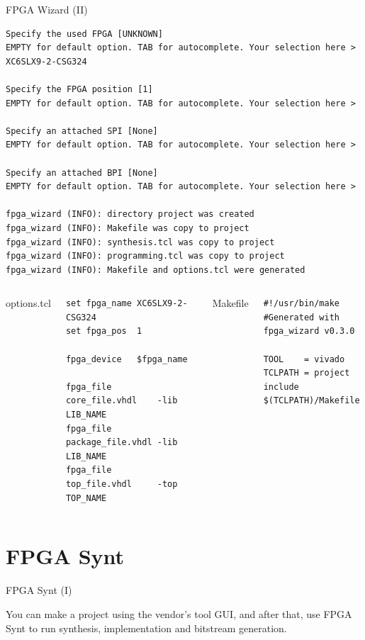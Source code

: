 \documentclass{beamer}
\begin{document}
\begin{frame}[fragile]{FPGA Wizard (II)}
  \tiny
  \begin{verbatim}
Specify the used FPGA [UNKNOWN]
EMPTY for default option. TAB for autocomplete. Your selection here > XC6SLX9-2-CSG324

Specify the FPGA position [1]
EMPTY for default option. TAB for autocomplete. Your selection here > 

Specify an attached SPI [None]
EMPTY for default option. TAB for autocomplete. Your selection here > 

Specify an attached BPI [None]
EMPTY for default option. TAB for autocomplete. Your selection here > 

fpga_wizard (INFO): directory project was created
fpga_wizard (INFO): Makefile was copy to project
fpga_wizard (INFO): synthesis.tcl was copy to project
fpga_wizard (INFO): programming.tcl was copy to project
fpga_wizard (INFO): Makefile and options.tcl were generated
  \end{verbatim}
  \begin{columns}
      options.tcl
      \begin{verbatim}
set fpga_name XC6SLX9-2-CSG324
set fpga_pos  1

fpga_device   $fpga_name

fpga_file     core_file.vhdl    -lib LIB_NAME
fpga_file     package_file.vhdl -lib LIB_NAME
fpga_file     top_file.vhdl     -top TOP_NAME
      \end{verbatim}
      Makefile
      \begin{verbatim}
#!/usr/bin/make
#Generated with fpga_wizard v0.3.0

TOOL    = vivado
TCLPATH = project
include $(TCLPATH)/Makefile
      \end{verbatim}
  \end{columns}
\end{frame}


\section{FPGA Synt}

\begin{frame}[fragile]{FPGA Synt (I)}
  \begin{block}{}
    You can make a project using the vendor's tool GUI, and after that, use FPGA Synt to run
    synthesis, implementation and bitstream generation.
  \end{block}{}
  \scriptsize
  
\end{frame}
\end{document}
